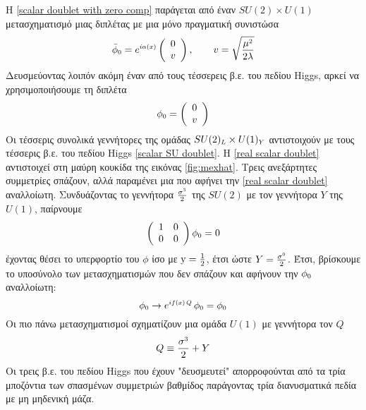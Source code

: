 Η \eqref{scalar doublet with zero comp} παράγεται από έναν $SU(2)\times U(1)$ μετασχηματισμό μιας διπλέτας με μια μόνο πραγματική συνιστώσα
\begin{equation}\label{real scalar doublet and u1 tran}
    \Bar{\phi}\subscr{0}=e\superscr{i\alpha (x)}\left(\begin{array}{c} 0\\ v \end{array}\right),\qquad v=\sqrt{\frac{\mu\superscr{2}}{2\lambda}}
\end{equation}
Δευσμεύοντας λοιπόν ακόμη έναν από τους τέσσερεις β.ε. του πεδίου Higgs, αρκεί να χρησιμοποιήσουμε τη διπλέτα
\begin{equation}\label{real scalar doublet}
     \phi\subscr{0}=\left(\begin{array}{c} 0\\ v \end{array}\right)
\end{equation}
Οι τέσσερις συνολικά γεννήτορες της ομάδας $SU(2)\subscr{L}\times U(1)\subscr{Y}$ 
αντιστοιχούν με τους τέσσερις β.ε. του πεδίου Higgs \eqref{scalar SU doublet}. Η \eqref{real scalar doublet} αντιστοιχεί στη μαύρη κουκίδα της εικόνας \ref{fig:mexhat}. Τρεις ανεξάρτητες συμμετρίες σπάζουν, αλλά παραμένει μια που αφήνει την  \eqref{real scalar doublet} αναλλοίωτη. Συνδυάζοντας το γεννήτορα $\frac{\sigma\superscr{3}}{2}$ της $SU(2)$ με τον γεννήτορα $Y$ της $U(1)$, παίρνουμε
\begin{equation}
\left(\begin{array}{cc}
     1 & 0 \\
     0 & 0
\end{array}\right) \phi\subscr{0} = 0
\end{equation}
έχοντας θέσει το υπερφορτίο του $\phi$ ίσο με $\text{y}=\frac{1}{2}$, έτσι ώστε $Y=\frac{\sigma\superscr{0}}{2}$. Έτσι, βρίσκουμε το υποσύνολο των μετασχηματισμών που δεν σπάζουν και αφήνουν την  $\phi\subscr{0}$ αναλλοίωτη:
\begin{equation}
    \phi\subscr{0}\rightarrow e\superscr{i f(x)\,{Q}}\,\phi\subscr{0}=\phi\subscr{0}
\end{equation}
Οι πιο πάνω μετασχηματισμοί σχηματίζουν μια ομάδα $U(1)$ με γεννήτορα τον $Q$
\begin{equation}\label{electric charge quantum number}
    Q\equiv\frac{\sigma\superscr{3}}{2}+Y
\end{equation}
Οι τρεις β.ε. του πεδίου Higgs που έχουν "δευσμευτεί" απορροφούνται από τα τρία μποζόντια των σπασμένων συμμετριών βαθμίδος παράγοντας τρία διανυσματικά πεδία με μη μηδενική μάζα. %

